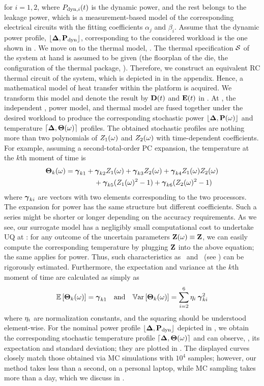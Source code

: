 for $i = 1, 2$, where $P_{\text{dyn}, i}(t)$ is the dynamic power, and the rest belongs to the leakage power, which is a measurement-based model of the corresponding electrical circuits with the fitting coefficients $\alpha_j$ and $\beta_i$. Assume that the dynamic power profile, $\profPdyn$, corresponding to the considered workload is the one shown in . We move on to the thermal model, . The thermal specification $\mathcal{S}$ of the system at hand is assumed to be given (the floorplan of the die, the configuration of the thermal package, \etc). Therefore, we construct an equivalent RC thermal circuit of the system, which is depicted in  in the appendix. Hence, a mathematical model of heat transfer within the platform is acquired. We transform this model and denote the result by $\mCF(\t)$ and $\mCS(\t)$ in . At , the independent \rvs, power model, and thermal model are fused together under the desired workload to produce the corresponding stochastic power $\profP{\o}$ and temperature $\profT{\o}$ profiles. The obtained stochastic profiles are nothing more than two polynomials of $Z_1(\omega)$ and $Z_2(\omega)$ with time-dependent coefficients. For example, assuming a second-total-order PC expansion, the temperature at the $k$th moment of time is
\begin{align*}
  {\boldsymbol\Theta}_k(\omega) &= {\boldsymbol\gamma}_{k1} + {\boldsymbol\gamma}_{k2} Z_1(\omega) + {\boldsymbol\gamma}_{k3} Z_2(\omega) + {\boldsymbol\gamma}_{k4} Z_1(\omega) Z_2(\omega) \\
  & \qquad \qquad {} + {\boldsymbol\gamma}_{k5} (Z_1(\omega)^2 - 1) + {\boldsymbol\gamma}_{k6} (Z_2(\omega)^2 - 1)
\end{align*}
where ${\boldsymbol\gamma}_{ki}$ are vectors with two elements corresponding to the two processors. The expansion for power has the same structure but different coefficients. Such a series might be shorter or longer depending on the accuracy requirements. As we see, our surrogate model has a negligibly small computational cost to undertake UQ at : for any outcome of the uncertain parameters $\mathbf{Z}(\omega) \equiv \mathbf{Z}$, we can easily compute the corresponding temperature by plugging $\mathbf{Z}$ into the above equation; the same applies for power. Thus, such characteristics as \cdfs\ and \pdfs\ (see ) can be rigorously estimated. Furthermore, the expectation and variance at the $k$th moment of time are calculated as simply as
\[
  \mathbb{E}\left[{\boldsymbol\Theta}_k(\omega)\right] = {\boldsymbol\gamma}_{k1} \hspace{1em} \text{and} \hspace{1em} \mathbb{V}\text{ar}\left[{\boldsymbol\Theta}_k(\omega)\right] = \sum_{i = 2}^{6} \eta_i \: {\boldsymbol\gamma}_{ki}^2
\]
where $\eta_i$ are normalization constants, and the squaring should be understood element-wise. For the nominal power profile $\profPdyn$ depicted in , we obtain the corresponding stochastic temperature profile $\profT{\o}$ and can observe, \eg, its expectation and standard deviation; they are plotted in . The displayed curves closely match those obtained via MC simulations with $10^4$ samples; however, our method takes less than a second, on a personal laptop, while MC sampling takes more than a day, which we discuss in .
